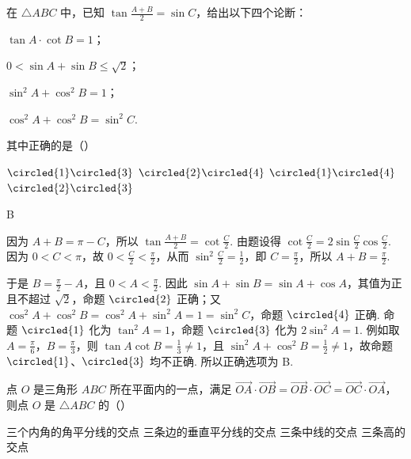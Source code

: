 \begin{problem}
在 \(\triangle ABC\) 中，已知 \(\tan \frac{A + B}{2} = \sin C\)，给出以下四个论断：

\begin{circlelist}
\item \(\tan A \cdot \cot B = 1\)；
\item \(0 < \sin A + \sin B \leqslant \sqrt{2}\)；
\item \(\sin^2 A + \cos^2 B = 1\)；
\item \(\cos^2 A + \cos^2 B = \sin^2 C\).
\end{circlelist}

其中正确的是（\quad）

\choices
    {\(\circled{1}\circled{3}\)}
    {\(\circled{2}\circled{4}\)}
    {\(\circled{1}\circled{4}\)}
    {\(\circled{2}\circled{3}\)}
\end{problem}

\begin{answer}
B
\end{answer}

\begin{solution}
因为 \(A+B=\pi-C\)，所以 \(\tan\frac{A+B}{2}=\cot\frac{C}{2}\).  由题设得 \(\cot\frac{C}{2}=2\sin\frac{C}{2}\cos\frac{C}{2}\).  因为 \(0<C<\pi\)，故 \(0<\frac{C}{2}<\frac{\pi}{2}\)，从而 \(\sin^{2}\frac{C}{2}=\frac{1}{2}\)，即 \(C=\frac{\pi}{2}\)，所以 \(A+B=\frac{\pi}{2}\).

于是 \(B=\frac{\pi}{2}-A\)，且 \(0<A<\frac{\pi}{2}\).  因此 \(\sin A+\sin B=\sin A+\cos A\)，其值为正且不超过 \(\sqrt{2}\)，命题 \(\circled{2}\) 正确；又 \(\cos^{2}A+\cos^{2}B=\cos^{2}A+\sin^{2}A=1=\sin^{2}C\)，命题 \(\circled{4}\) 正确.  命题 \(\circled{1}\) 化为 \(\tan^{2}A=1\)，命题 \(\circled{3}\) 化为 \(2\sin^{2}A=1\). 例如取 \(A=\frac{\pi}{6}\)，\(B=\frac{\pi}{3}\)，则 \(\tan A\cot B=\frac{1}{3}\ne1\)，且 \(\sin^{2}A+\cos^{2}B=\frac{1}{2}\ne1\)，故命题 \(\circled{1}\)、\(\circled{3}\) 均不正确. 所以正确选项为 B.
\end{solution}

\begin{problem}
点 \(O\) 是三角形 \(ABC\) 所在平面内的一点，满足 \(\overrightarrow{OA}\cdot\overrightarrow{OB}=\overrightarrow{OB}\cdot\overrightarrow{OC}=\overrightarrow{OC}\cdot\overrightarrow{OA}\)，则点 \(O\) 是 \(\triangle ABC\) 的（\quad）

\choices
    {三个内角的角平分线的交点}
    {三条边的垂直平分线的交点}
    {三条中线的交点}
    {三条高的交点}
\end{problem}

